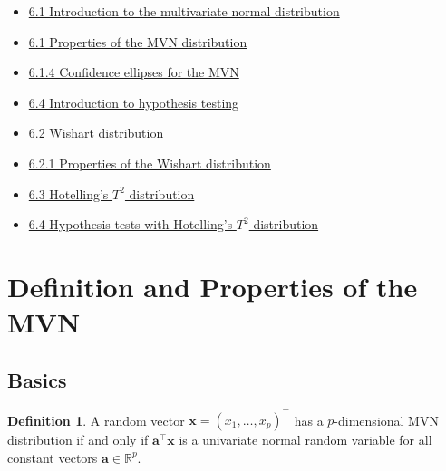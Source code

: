 \documentclass[]{book}
\providecommand{\tightlist}{%
  \setlength{\itemsep}{0pt}\setlength{\parskip}{0pt}}
\theoremstyle{definition}
\newtheorem{definition}{Definition}[chapter]
\theoremstyle{definition}
\theoremstyle{definition}
\theoremstyle{remark}
\begin{document}
\begin{itemize}
\tightlist
\item
  \href{https://mediaspace.nottingham.ac.uk/media/Multivariate+Normal+Random+VariablesA+Introduction/1_pdjxphay}{6.1 Introduction to the multivariate normal distribution}
\item
  \href{https://mediaspace.nottingham.ac.uk/media/Multivariate+Normal+Random+VariablesA++Properties/1_j9mh4v7r}{6.1 Properties of the MVN distribution}
\item
  \href{https://mediaspace.nottingham.ac.uk/media/Multivariate+Normal+Random+VariablesA++Confidence+Ellipses/1_dlvgqoi3}{6.1.4 Confidence ellipses for the MVN}
\item
  \href{https://mediaspace.nottingham.ac.uk/media/MVN_HypothesistestIntro.mp4/1_b1gstf1h}{6.4 Introduction to hypothesis testing}
\item
  \href{https://mediaspace.nottingham.ac.uk/media/MVN_Wishart/1_3kpedgb6}{6.2 Wishart distribution}
\item
  \href{https://mediaspace.nottingham.ac.uk/media/MVN_WishartProperties/1_yfgzcsyb}{6.2.1 Properties of the Wishart distribution}
\item
  \href{https://mediaspace.nottingham.ac.uk/media/MVN_Hotelling.mp4/1_5evjeyu8}{6.3 Hotelling's \(T^2\) distribution}
\item
  \href{https://mediaspace.nottingham.ac.uk/media/Multivariate+NormalsA+Hypothesis+testing/1_bhk20k5z}{6.4 Hypothesis tests with Hotelling's \(T^2\) distribution}
\end{itemize}

\hypertarget{definition-and-properties-of-the-mvn}{%
\section{Definition and Properties of the MVN}\label{definition-and-properties-of-the-mvn}}

\hypertarget{basics}{%
\subsection{Basics}\label{basics}}

\begin{definition}
\protect\hypertarget{def:mvn}{}{\label{def:mvn} }A random vector \(\mathbf x=(x_1, \ldots , x_p)^\top\) has a \(p\)-dimensional MVN distribution if and only if \(\mathbf a^\top \mathbf x\) is a univariate normal random variable for all constant vectors \(\mathbf a\in \mathbb{R}^p\).
\end{definition}
\end{document}
